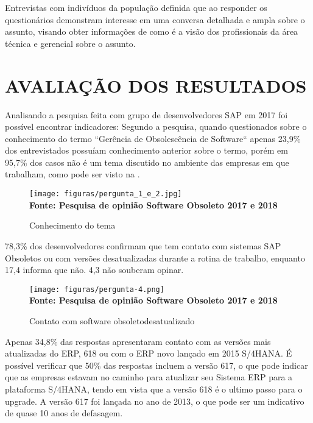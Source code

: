 Entrevistas com indivíduos da população definida que ao responder os questionários demonstram interesse em uma conversa detalhada e ampla sobre o assunto, visando obter informações de como é a visão dos profissionais da área técnica e gerencial sobre o assunto.

\section{\esp AVALIAÇÃO DOS RESULTADOS}

Analisando a pesquisa feita com grupo de desenvolvedores SAP em 2017 foi possível encontrar indicadores:
Segundo a pesquisa, quando questionados sobre o conhecimento do termo “Gerência de Obsolescência de Software“ apenas 23,9\% dos entrevistados possuíam conhecimento anterior sobre o termo, porém em 95,7\% dos casos não é um tema discutido no ambiente das empresas em que trabalham, como pode ser visto na \cite{fig:figura3}.

\begin{figure}[ht]
	\centering	
	\caption[\hspace{0.1cm}Q1.]{Conhecimento do tema}
	\vspace{-0.4cm}
	\texttt{[image: figuras/pergunta\_1\_e\_2.jpg]}
	\vspace{-0.2cm}
	\\\textbf{\footnotesize Fonte: Pesquisa de opinião Software Obsoleto 2017 e 2018 }	
	\label{fig:figura3}
\end{figure}
\vspace{-0.5cm}

78,3\% dos desenvolvedores confirmam que tem contato com sistemas SAP Obsoletos ou com versões desatualizadas durante a rotina de trabalho, enquanto 17,4 informa que não. 4,3 não souberam opinar.

\begin{figure}[ht]
	\centering	
	\caption[\hspace{0.1cm}Q1.]{Contato com software obsoleto\/desatualizado}
	\vspace{-0.4cm}
	\texttt{[image: figuras/pergunta-4.png]}
	\vspace{-0.2cm}
	\\\textbf{\footnotesize Fonte: Pesquisa de opinião Software Obsoleto 2017 e 2018 }	
	\label{fig:figura4}
\end{figure}
\vspace{-0.5cm}
\newpage
Apenas 34,8\% das respostas apresentaram contato com as versões mais atualizadas
do ERP, 618 ou com o ERP novo lançado em 2015 S/4HANA. É possível verificar que 50\% das respostas incluem a versão 617, o que pode indicar
que as empresas estavam no caminho para atualizar seu Sistema ERP para a
plataforma S/4HANA, tendo em vista que a versão 618 é o ultimo passo para o upgrade.
A versão 617 foi lançada no ano de 2013, o que pode ser um indicativo de quase 10 anos de defasagem.  

